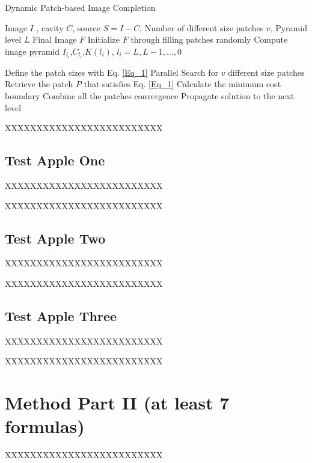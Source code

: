 \documentclass[journal]{IEEEtran}
\begin{document}
\renewcommand{\algorithmicrequire}{\textbf{Input:}}
\renewcommand{\algorithmicensure}{\textbf{Output:}}

\begin{algorithm}
	\caption{Dynamic Patch-based Image Completion}
	\label{pseudocode}
	\begin{algorithmic}[1]
		\Require Image $I$ , cavity $C$, source $S=I-C$,
		Number of different size patches $v$,
		Pyramid level $L$
		\Ensure Final Image  $F$
		\State Initialize $F$ through filling patches randomly
		\State Compute image pyramid $I_{l_i}$,$C_{l_i}$,$K(l_i)$, $l_i=L,L-1,\dots,0 $
		
		\State Define the patch sizes with Eq. \ref{Eq_1}
		\Repeat
		\State Parallel Search for $v$ different size patches
		\State Retrieve the patch $P$  that satisfies Eq. \ref{Eq_1}
		\EndFor
		\State Calculate the minimum cost boundary
		\State Combine all the patches
		\Until convergence
		\State Propagate solution to the next level
		
		\EndFor
	\end{algorithmic}\label{holefillalg}
\end{algorithm}


XXXXXXXXXXXXXXXXXXXXXXXXX




\subsection{Test Apple One}
XXXXXXXXXXXXXXXXXXXXXXXXX

XXXXXXXXXXXXXXXXXXXXXXXXX

\subsection{Test Apple Two}
XXXXXXXXXXXXXXXXXXXXXXXXX

XXXXXXXXXXXXXXXXXXXXXXXXX

\subsection{Test Apple Three}
XXXXXXXXXXXXXXXXXXXXXXXXX

XXXXXXXXXXXXXXXXXXXXXXXXX

\section{Method Part II (at least 7 formulas)}
XXXXXXXXXXXXXXXXXXXXXXXXX
\end{document}
